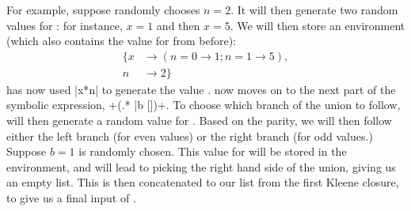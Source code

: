 For example, suppose \ourDSL randomly chooses $n=2$.
It will then generate two random values for :
for instance, $x=1$ and then $x=5$. We will then store an environment
(which also contains the value for  from before):
\begin{align*}
\{ x &\rightarrow (n = 0 \rightarrow 1; n = 1 \rightarrow 5), \\
   n &\rightarrow 2 \}
\end{align*}
\ourDSL has now used \hskin|x*{n}| to generate the value
\hskin{[1, 5]}.
\ourDSL now moves on to the next part of the symbolic expression,
\hskin+(.* |{b} [])+.
To choose which branch of the union to follow,
\ourDSL will then generate a random value for .
Based on the parity,
we will then follow either the left branch (for even values)
or the right branch (for odd values.)
Suppose $b = 1$ is randomly chosen.
This value for  will be stored in the environment,
and will lead to picking the right hand side of the union,
giving us an empty list.
This is then concatenated to our list from the first Kleene closure,
to give us a final input of \hskin{[1, 5]}.


